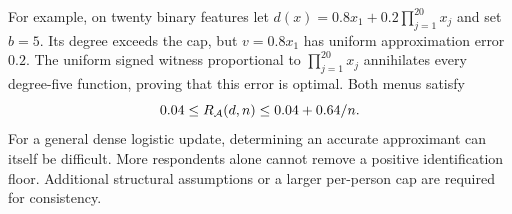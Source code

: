 For example, on twenty binary features let $d(x)=0.8x_1+0.2\prod_{j=1}^{20}x_j$ and set $b=5$. Its degree exceeds the cap, but $v=0.8x_1$ has uniform approximation error $0.2$. The uniform signed witness proportional to $\prod_{j=1}^{20}x_j$ annihilates every degree-five function, proving that this error is optimal. Both menus satisfy
\[
 0.04\le R_\mathcal A(d,n)\le0.04+0.64/n.
\]
For a general dense logistic update, determining an accurate approximant can itself be difficult. More respondents alone cannot remove a positive identification floor. Additional structural assumptions or a larger per-person cap are required for consistency.
